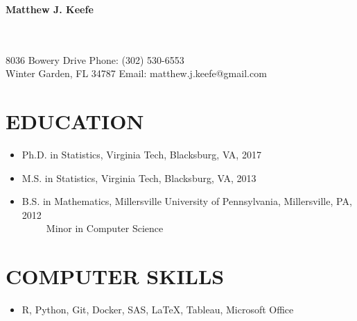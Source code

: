 \documentclass[10pt]{article}
\begin{document}
\begin{center}
{\Large{\bf{Matthew J. Keefe}}}\\
\end{center}
\underline{\hspace{7.3in}}\\
~~\\
8036 Bowery Drive  \hfill Phone: (302) 530-6553\\
Winter Garden, FL 34787 \hfill Email: matthew.j.keefe@gmail.com\\
\underline{\hspace{7.3in}}
\section*{EDUCATION}
\begin{itemize}
\item[] {Ph.D.} in Statistics,  Virginia Tech, Blacksburg, VA, 2017  
\item[] {M.S.} in Statistics, Virginia Tech, Blacksburg, VA, 2013 
\item[] { B.S.} in Mathematics, Millersville University of Pennsylvania, Millersville, PA, 2012\\
\mbox{~~~~~}Minor in Computer Science
\end{itemize}

\section*{COMPUTER SKILLS}
\begin{itemize}
\item[] R, Python, Git, Docker, SAS, \LaTeX, Tableau, Microsoft Office 
\end{itemize}
\end{document}
